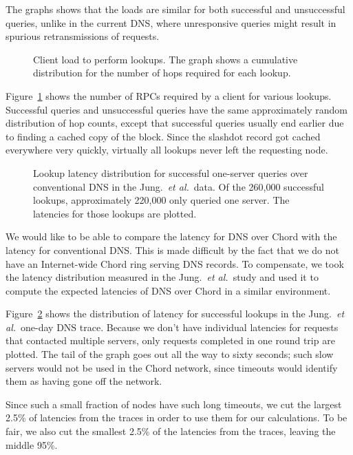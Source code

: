 The graphs shows that the loads are similar for both
successful and unsuccessful queries, unlike in the current
DNS, where unresponsive queries might result in spurious 
retransmissions of requests.

\begin{figure}[h]
\caption{Client load to perform lookups. 
The graph shows a cumulative distribution for the number
of hops required for each lookup.}
\label{fig:hops}
\end{figure}

Figure~\ref{fig:hops} shows the number of RPCs required
by a client for various lookups.
Successful queries and unsuccessful queries have the same
approximately random distribution of hop counts, except
that successful queries usually end earlier due to finding
a cached copy of the block.
Since the slashdot record got cached everywhere very quickly,
virtually all lookups never left the requesting node.

\begin{figure}[h]
\caption{Lookup latency distribution for successful one-server
queries over conventional DNS in the Jung.~{\em et al.}\ data.
Of the 260,000 successful lookups,
approximately 220,000 only queried one server.  The latencies for
those lookups are plotted.}
\label{fig:oklat}
\end{figure}

We would like to be able to compare the latency for DNS over Chord
with the latency for conventional DNS.  This is made difficult by the fact
that we do not have an Internet-wide Chord ring serving DNS records.
To compensate, we took the latency distribution measured in the Jung.~{\em et al.}\ study
and used it to compute the expected latencies of DNS over Chord
in a similar environment.

Figure~\ref{fig:oklat} shows the distribution of latency
for successful lookups in the Jung.~{\em et al.}\ one-day DNS trace.
Because we don't have individual latencies for requests that 
contacted multiple servers, only requests completed in one
round trip are plotted.
The tail of the graph goes out all the way to sixty seconds;
such slow servers would not be used in the Chord network,
since timeouts would identify them as having gone off the network.

Since such a small fraction of nodes have such long timeouts,
we cut the largest 2.5\% of latencies from the traces in order
to use them for our calculations.
To be fair, we also cut the smallest 2.5\% of the latencies 
from the traces, leaving the middle 95\%.

